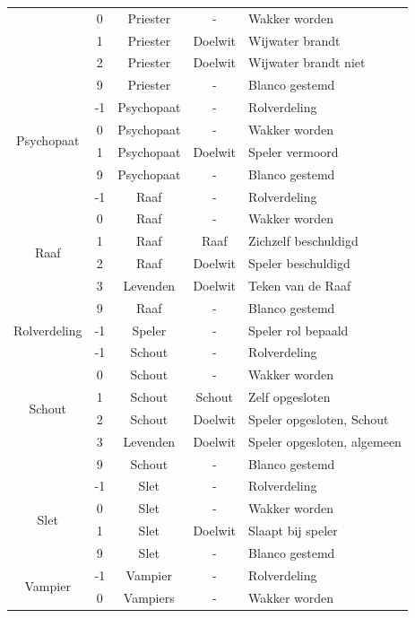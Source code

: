 \documentclass[12pt]{article}
\begin{document}
\begin{center}
\begin{longtable}{c|c|c|c|l}
       & 0 & Priester & - & Wakker worden \\
       & 1 & Priester & Doelwit & Wijwater brandt \\
       & 2 & Priester & Doelwit & Wijwater brandt niet \\
       & 9 & Priester & - & Blanco gestemd \\
      \hline
      \multirow{4}{*}{Psychopaat} & -1 & Psychopaat & - & Rolverdeling \\
       & 0 & Psychopaat & - & Wakker worden \\
       & 1 & Psychopaat & Doelwit & Speler vermoord \\
       & 9 & Psychopaat & - & Blanco gestemd \\
      \hline
      \multirow{6}{*}{Raaf} & -1 & Raaf & - & Rolverdeling \\
       & 0 & Raaf & - & Wakker worden \\
       & 1 & Raaf & Raaf & Zichzelf beschuldigd \\
       & 2 & Raaf & Doelwit & Speler beschuldigd \\
       & 3 & Levenden & Doelwit & Teken van de Raaf \\
       & 9 & Raaf & - & Blanco gestemd \\
      \hline
      \multirow{1}{*}{Rolverdeling} & -1 & Speler & - & Speler rol bepaald \\
      \hline
      \multirow{6}{*}{Schout} & -1 & Schout & - & Rolverdeling \\
       & 0 & Schout & - & Wakker worden \\
       & 1 & Schout & Schout & Zelf opgesloten \\
       & 2 & Schout & Doelwit & Speler opgesloten, Schout \\
       & 3 & Levenden & Doelwit & Speler opgesloten, algemeen \\
       & 9 & Schout & - & Blanco gestemd \\
      \hline
      \multirow{4}{*}{Slet} & -1 & Slet & - & Rolverdeling \\
       & 0 & Slet & - & Wakker worden \\
       & 1 & Slet & Doelwit & Slaapt bij speler \\
       & 9 & Slet & - & Blanco gestemd \\
      \hline
      \multirow{4}{*}{Vampier} & -1 & Vampier & - & Rolverdeling \\
       & 0 & Vampiers & - & Wakker worden \\

\end{longtable}
\end{center}
\end{document}
